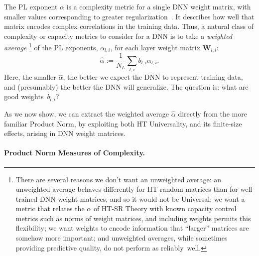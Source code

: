 The PL exponent $\alpha$ is a complexity metric for a single DNN weight matrix, with smaller values corresponding to greater regularization~\cite{MM18_TR}.
It describes how well that matrix encodes complex correlations in the training data.
Thus, a natural class of complexity or capacity metrics to consider for a DNN is to take a \emph{weighted average}%
\footnote{There are several reasons we don't want an unweighted average: 
an unweighted average behaves differently for HT random matrices than for well-trained DNN weight matrices, and so it would not be Universal; 
we want a metric that relates the $\alpha$ of HT-SR Theory with known capacity control metrics such as norms of weight matrices, and including weights permits this flexibility; 
we want weights to encode information that ``larger'' matrices are somehow more important;
and unweighted averages, while sometimes providing predictive quality, do not perform as reliably~well. }
of the PL exponents, $\alpha_{l,i}$, for each layer weight matrix $\mathbf{W}_{l,i}$:
\begin{equation}
\hat{\alpha}:=\dfrac{1}{N_L}\sum_{l,i}b_{l,i}\alpha_{l,i}  .
\label{eqn:alpha_hat_generic}
\end{equation}
Here, the smaller $\hat{\alpha}$, the better we expect the DNN to represent training data, and (presumably) the better the DNN will generalize.  %
The question is: what are good weights~$b_{l,i}$?

As we now show, we can extract the weighted average $\hat{\alpha}$ directly from the more familiar Product Norm, by exploiting both HT Universality, and its finite-size effects, arising
in DNN weight matrices.




\paragraph{Product Norm Measures of Complexity.} 

